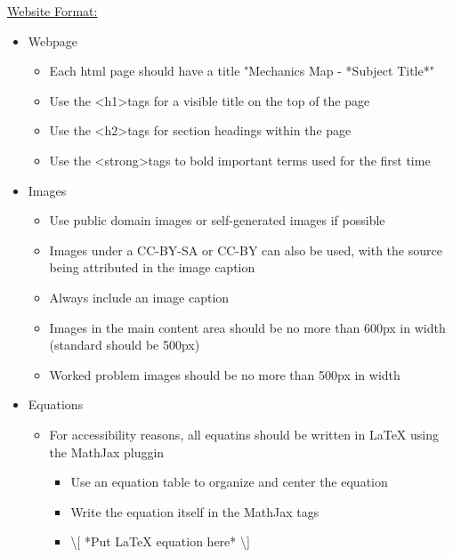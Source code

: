 \documentclass[a4paper]{article}
\begin{document}
\underline{Website Format:}
\begin{itemize}
	\item Webpage
		\begin{itemize}
				\item Each html page should have a title "Mechanics Map - *Subject Title*"
				\item Use the \textless h1\textgreater \space tags for a visible title on the top of the page
				\item Use the \textless h2\textgreater \space tags for section headings within the page
				\item Use the \textless strong\textgreater \space tags to bold important terms used for the first time
		\end{itemize}
	\item Images
		\begin{itemize}
				\item Use public domain images or self-generated images if possible
				\item Images under a CC-BY-SA or CC-BY can also be used, with the source being attributed in the image caption
				\item Always include an image caption
				\item Images in the main content area should be no more than 600px in width (standard should be 500px)
				\item Worked problem images should be no more than 500px in width
		\end{itemize}
	\item Equations
		\begin{itemize}
				\item For accessibility reasons, all equatins should be written in LaTeX using the MathJax pluggin
					\begin{itemize}
						\item Use an equation table to organize and center the equation
						\item Write the equation itself in the MathJax tags
						\item \textbackslash[ *Put LaTeX equation here* \textbackslash]
					\end {itemize}
		\end{itemize}
\end {itemize}
\end{document}
